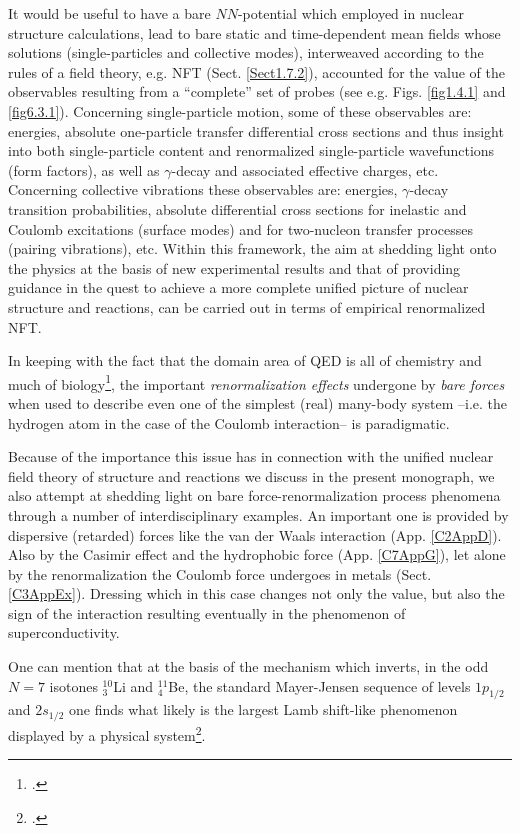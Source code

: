 It would be  useful to have a bare $NN$-potential  which employed in nuclear structure calculations, lead to bare static and  time-dependent mean fields whose solutions (single-particles and collective modes), interweaved according to the rules of a field theory, e.g. NFT (Sect. \ref{Sect1.7.2}), accounted for the value of the observables resulting from a ``complete'' set of probes (see e.g. Figs. \ref{fig1.4.1} and \ref{fig6.3.1}). Concerning single-particle motion, some of these observables are: energies, absolute one-particle transfer differential cross sections and thus insight into both single-particle content and renormalized single-particle wavefunctions (form factors), as well as $\gamma$-decay and associated effective charges, etc. Concerning collective vibrations these observables are: energies, $\gamma$-decay transition probabilities, absolute differential cross sections for inelastic and Coulomb excitations (surface modes) and for two-nucleon transfer processes (pairing vibrations), etc.
Within this framework, the aim at shedding light onto the physics at the basis of new experimental results and that of providing guidance in the quest to achieve a more complete unified picture of nuclear structure and reactions, can be carried out in terms of empirical renormalized NFT.  

In keeping with the fact that the domain area of QED is all of chemistry and much of biology\footnote{\cite{Feynman:06}.}, the important \textit{renormalization effects} undergone by \textit{bare forces} when used to describe even one of the simplest (real) many-body system --i.e. the hydrogen atom in the case of the Coulomb interaction-- is paradigmatic. 


Because of the  importance this issue has in connection with the unified nuclear field theory of structure and reactions we discuss in the present monograph,  we also attempt at shedding light on bare force-renormalization process phenomena through a number of interdisciplinary examples. An important  one is provided by dispersive (retarded) forces like the van der Waals interaction (App. \ref{C2AppD}). Also by the Casimir effect and the hydrophobic force (App. \ref{C7AppG}), let alone by the renormalization the Coulomb force undergoes in metals (Sect. \ref{C3AppEx}). Dressing which in this case changes not only the value, but also the sign of the interaction  resulting eventually in the phenomenon of superconductivity.  


 One can mention that at the basis of the mechanism which inverts, in the odd $N=7$ isotones $^{10}_3$Li and $^{11}_4$Be, the standard Mayer-Jensen sequence of levels $1p_{1/2}$ and $2s_{1/2}$ one finds what likely is  the largest Lamb shift-like phenomenon displayed by a physical system\footnote{\cite{Barranco:17}.}.
